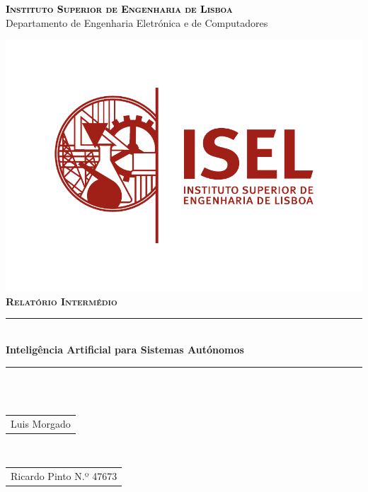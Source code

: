 \begin{titlepage}
\begin{center}

\textsc{\Large \textcolor{black}{\textbf{Instituto Superior de Engenharia de Lisboa}}}\\[0.4cm]	

{\huge \Large{Departamento de Engenharia Eletrónica e de Computadores} \\[1cm] }

\includegraphics{logoISEL}\\[1cm]

\textsc{\Large \textbf{Relatório Intermédio}}\\[0.4cm]	


\rule{\linewidth}{0.7mm} \\[0.4cm]
{ \Large \bfseries\color{black!70!black} Inteligência Artificial para Sistemas Autónomos \\[0.4cm] }
\rule{\linewidth}{0.7mm} \\[1cm]


\\[0.6cm]

\begin{tabular}{l}
\large  Luis Morgado \\[1cm]
\end{tabular}

\\[0.6cm]
\color{black}
\centering
\begin{tabular}{l}

\large Ricardo Pinto N.º 47673 \\[0.4cm]
\end{tabular}

\vfill

\large {}\\[0.2cm]

\end{center}
\end{titlepage}